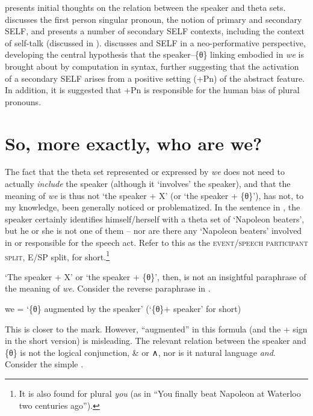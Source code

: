 \documentclass[output=paper]{LSP/langsci}
\begin{document}
 presents initial thoughts on the relation between the speaker and theta sets.  discusses the first person singular pronoun, the notion of primary and secondary SELF, and presents a number of secondary SELF contexts, including the context of self-talk (discussed in \citealt{Holmberg2010yourself}).  discusses  and SELF in a neo-performative perspective, developing the central hypothesis that the speaker–\{θ\} linking embodied in \textit{we} is brought about by  computation in syntax, further suggesting that the activation of a secondary SELF arises from a positive setting (+Pn) of the abstract  feature. In addition, it is suggested that +Pn is responsible for the human bias of plural pronouns.

\section{So, more exactly, who are we?}\label{sec:Sigurdsson:2}

The fact that the theta set represented or expressed by \textit{we} does not need to actually \textit{include} the speaker (although it ‘involves’ the speaker), and that the meaning of \textit{we} is thus not ‘the speaker + X’ (or ‘the speaker + \{θ\}’), has not, to my knowledge, been generally noticed or problematized. In the sentence in , the speaker certainly identifies himself/herself with a theta set of ‘Napoleon beaters’, but he or she is not one of them – nor are there any ‘Napoleon beaters’ involved in or responsible for the speech act. Refer to this as the \textsc{event\slash speech participant split}, E/SP split, for short.\footnote{It is also found for plural \textit{you} (as in “You finally beat Napoleon at Waterloo two centuries ago”).}

  ‘The speaker + X’ or ‘the speaker + \{θ\}’, then, is not an insightful paraphrase of the meaning of \textit{we}. Consider the reverse paraphrase in .

\ea%
    \label{ex:Sigurdsson:8}   we = ‘\{θ\} augmented by the speaker’  (‘\{θ\}+ speaker’ for short)
\z

This is closer to the mark. However, ``augmented'' in this formula (and the + sign in the short version) is misleading. The relevant relation between the speaker and \{θ\} is not the logical conjunction, \& or ∧, nor is it natural language \textit{and}. Consider the simple .
\end{document}
